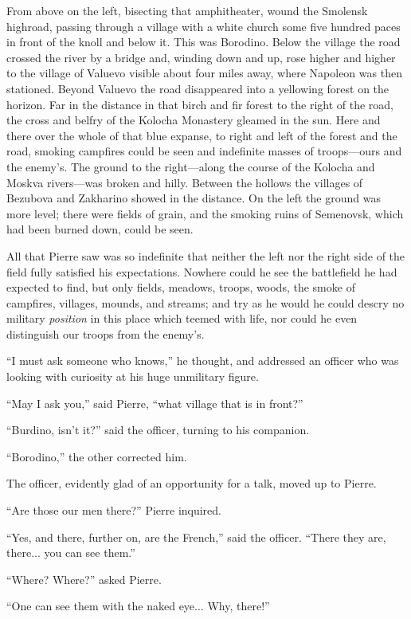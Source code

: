From above on the left, bisecting that amphitheater, wound the
Smolensk highroad, passing through a village with a white church
some five hundred paces in front of the knoll and below it. This
was Borodino.  Below the village the road crossed the river by a
bridge and, winding down and up, rose higher and higher to the
village of Valuevo visible about four miles away, where Napoleon
was then stationed. Beyond Valuevo the road disappeared into a
yellowing forest on the horizon. Far in the distance in that
birch and fir forest to the right of the road, the cross and
belfry of the Kolocha Monastery gleamed in the sun. Here and
there over the whole of that blue expanse, to right and left of
the forest and the road, smoking campfires could be seen and
indefinite masses of troops---ours and the enemy's. The ground to
the right---along the course of the Kolocha and Moskva
rivers---was broken and hilly.  Between the hollows the villages
of Bezubova and Zakharino showed in the distance. On the left the
ground was more level; there were fields of grain, and the
smoking ruins of Semenovsk, which had been burned down, could be
seen.

All that Pierre saw was so indefinite that neither the left nor
the right side of the field fully satisfied his
expectations. Nowhere could he see the battlefield he had
expected to find, but only fields, meadows, troops, woods, the
smoke of campfires, villages, mounds, and streams; and try as he
would he could descry no military \emph{position} in this place
which teemed with life, nor could he even distinguish our troops
from the enemy's.

``I must ask someone who knows,'' he thought, and addressed an
officer who was looking with curiosity at his huge unmilitary
figure.

``May I ask you,'' said Pierre, ``what village that is in
front?''

``Burdino, isn't it?'' said the officer, turning to his
companion.

``Borodino,'' the other corrected him.

The officer, evidently glad of an opportunity for a talk, moved
up to Pierre.

``Are those our men there?'' Pierre inquired.

``Yes, and there, further on, are the French,'' said the
officer. ``There they are, there... you can see them.''

``Where? Where?'' asked Pierre.

``One can see them with the naked eye... Why, there!''

